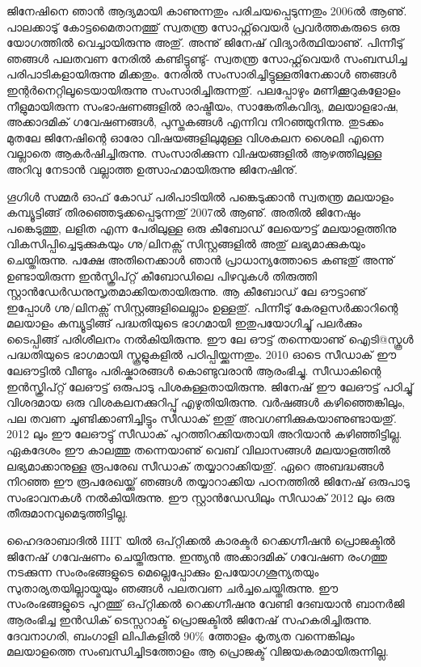 \newpage
{}
 
ജിനേഷിനെ ഞാന്‍ ആദ്യമായി കാണുന്നതും പരിചയപ്പെടുന്നതും 2006ല്‍ ആണു്. പാലക്കാടു് കോട്ടമൈതാനത്തു് സ്വതന്ത്ര സോഫ്റ്റ്‌‌വെയര്‍ പ്രവര്‍ത്തകരുടെ ഒരു യോഗത്തില്‍ വെച്ചായിരുന്നു അതു്. അന്നു് ജിനേഷ് വിദ്യാര്‍ത്ഥിയാണു്. പിന്നീടു് ഞങ്ങള്‍ പലതവണ നേരില്‍ കണ്ടിട്ടുണ്ടു്- സ്വതന്ത്ര സോഫ്റ്റ്‌വെയര്‍ സംബന്ധിച്ച പരിപാടികളായിരുന്നു മിക്കതും. നേരില്‍ സംസാരിച്ചിട്ടുള്ളതിനേക്കാള്‍ ഞങ്ങള്‍ ഇന്റര്‍നെറ്റിലൂടെയായിരുന്നു സംസാരിച്ചിരുന്നതു്. പലപ്പോഴും മണിക്കൂറുകളോളം നീളുമായിരുന്ന സംഭാഷണങ്ങളില്‍ രാഷ്ട്രീയം, സാങ്കേതികവിദ്യ, മലയാളഭാഷ, അക്കാദമിക് ഗവേഷണങ്ങള്‍, പുസ്തകങ്ങള്‍ എന്നിവ നിറഞ്ഞുനിന്നു. തുടക്കം മുതലേ ജിനേഷിന്റെ ഓരോ വിഷയങ്ങളിലുമുള്ള വിശകലന ശൈലി എന്നെ വല്ലാതെ ആകര്‍ഷിച്ചിരുന്നു. സംസാരിക്കുന്ന വിഷയങ്ങളില്‍ ആഴത്തിലുള്ള അറിവു നേടാന്‍ വല്ലാത്ത ഉത്സാഹമായിരുന്നു ജിനേഷിനു്.
 
ഗൂഗിള്‍ സമ്മര്‍ ഓഫ് കോഡ് പരിപാടിയില്‍ പങ്കെടുക്കാന്‍ സ്വതന്ത്ര മലയാളം കമ്പ്യൂട്ടിങ്ങ് തിരഞ്ഞെടുക്കപ്പെടുന്നതു് 2007ല്‍ ആണു്. അതില്‍ ജിനേഷും പങ്കെടുത്തു, ലളിത എന്ന പേരിലുള്ള ഒരു കീബോഡ് ലേയൌട്ട്  മലയാളത്തിനു വികസിപ്പിച്ചെടുക്കുകയും  ഗ്നു/ലിനക്സ് സിസ്റ്റങ്ങളില്‍ അതു് ലഭ്യമാക്കുകയും ചെയ്തിരുന്നു. പക്ഷേ അതിനെക്കാള്‍ ഞാന്‍ പ്രാധാന്യത്തോടെ കണ്ടതു് അന്നു് ഉണ്ടായിരുന്ന ഇന്‍സ്ക്രിപ്റ്റ് കീബോഡിലെ പിഴവുകള്‍ തിരുത്തി സ്റ്റാന്‍ഡേര്‍ഡനുസൃതമാക്കിയതായിരുന്നു. ആ കീബോഡ് ലേ ഔട്ടാണു്  ഇപ്പോള്‍ ഗ്നു/ലിനക്സ് സിസ്റ്റങ്ങളിലെല്ലാം ഉള്ളതു്. പിന്നീടു് കേരളസര്‍ക്കാറിന്റെ മലയാളം കമ്പ്യൂട്ടിങ്ങ് പദ്ധതിയുടെ ഭാഗമായി ഇതുപയോഗിച്ചു് പലര്‍ക്കും ടൈപ്പിങ്ങ് പരിശീലനം നല്‍കിയിരുന്നു. ഈ ലേ ഔട്ട് തന്നെയാണു് ഐടി@സ്കൂൾ പദ്ധതിയുടെ ഭാഗമായി സ്കൂളുകളില്‍ പഠിപ്പിയ്ക്കുന്നതും. 2010 ഓടെ സീഡാക്‍ ഈ ലേഔട്ടില്‍ വീണ്ടും പരിഷ്കാരങ്ങള്‍ കൊണ്ടുവരാന്‍ ആരംഭിച്ചു. സീഡാകിന്റെ ഇന്‍സ്ക്രിപ്റ്റ് ലേഔട്ട് ഒരുപാടു പിശകുള്ളതായിരുന്നു. ജിനേഷ് ഈ ലേഔട്ട് പഠിച്ചു് വിശദമായ ഒരു വിശകലനക്കുറിപ്പു് എഴുതിയിരുന്നു. വര്‍ഷങ്ങള്‍ കഴിഞ്ഞെങ്കിലും, പല തവണ ചൂണ്ടിക്കാണിച്ചിട്ടും സീഡാക്‍ ഇതു് അവഗണിക്കുകയാണുണ്ടായതു്. 2012 ലും ഈ ലേഔട്ടു് സീഡാക്‍ പുറത്തിറക്കിയതായി അറിയാന്‍ കഴിഞ്ഞിട്ടില്ല. ഏകദേശം ഈ കാലത്തു തന്നെയാണു് വെബ് വിലാസങ്ങള്‍ മലയാളത്തില്‍ ലഭ്യമാക്കാനുള്ള രൂപരേഖ സീഡാക്‍ തയ്യാറാക്കിയതു്. ഏറെ അബദ്ധങ്ങള്‍ നിറഞ്ഞ ഈ രൂപരേഖയ്ക്കു് ഞങ്ങള്‍ തയ്യാറാക്കിയ പഠനത്തില്‍ ജിനേഷ് ഒരുപാടു സംഭാവനകള്‍ നല്‍കിയിരുന്നു. ഈ സ്റ്റാന്‍ഡേഡിലും സീഡാക്‍ 2012 ലും ഒരു തീരുമാനവുമെടുത്തിട്ടില്ല.
 
ഹൈദരാബാദില്‍ IIIT യില്‍ ഒപ്റ്റിക്കല്‍ കാരക്ടര്‍ റെക്കഗ്നീഷന്‍ പ്രൊജക്ടില്‍ ജിനേഷ് ഗവേഷണം ചെയ്തിരുന്നു. ഇന്ത്യന്‍ അക്കാദമിക് ഗവേഷണ രംഗത്തു നടക്കുന്ന സംരംഭങ്ങളുടെ മെല്ലെപ്പോക്കും ഉപയോഗശൂന്യതയും സുതാര്യതയില്ലായ്മയും ഞങ്ങള്‍ പലതവണ ചര്‍ച്ചചെയ്തിരുന്നു. ഈ സംരംഭങ്ങളുടെ പുറത്തു് ഒപ്റ്റിക്കല്‍ റെക്കഗ്നീഷനു വേണ്ടി ദേബയാന്‍ ബാനര്‍ജി ആരംഭിച്ച ഇന്‍ഡിക് ടെസ്സറാക്ട് പ്രൊജക്ടില്‍ ജിനേഷ് സഹകരിച്ചിരുന്നു. ദേവനാഗരി, ബംഗാളി ലിപികളില്‍ 90\% ത്തോളം കൃത്യത വന്നെങ്കിലും മലയാളത്തെ സംബന്ധിച്ചിടത്തോളം ആ പ്രൊജക്ട് വിജയകരമായിരുന്നില്ല.
 
